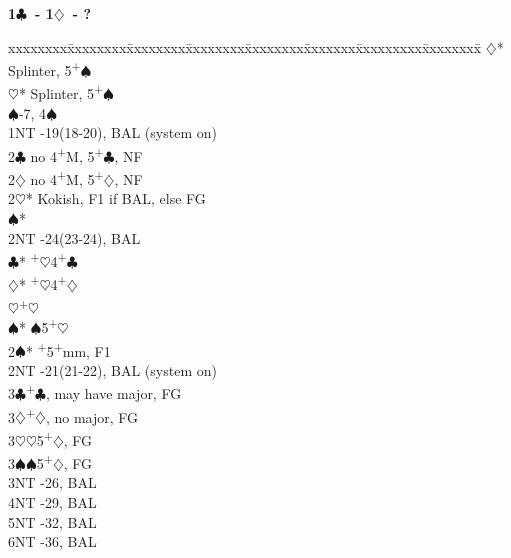\documentclass[10pt]{article}
\renewcommand{\c}{$\clubsuit$}
\renewcommand{\d}{$\diamondsuit$}
\newcommand{\h}{$\heartsuit$}
\newcommand{\s}{$\spadesuit$}
\newcommand{\p}{\textsuperscript{+}}
\newenvironment{bidtable}[1][]
{\textbf{#1}
  \begin{adjustwidth}{1em}{}
    \addvspace{2pt}
    \begin{tabbing}
      xxxxxxxx\=xxxxxxxx\=xxxxxxxx\=xxxxxxxx\=xxxxxxxx\=xxxxxxx\=xxxxxxxxx\=xxxxxxxx\=\kill}
{\end{tabbing}\end{adjustwidth}\bigskip}%
\begin{document}
\begin{bidtable}[1\c\ - 1\d\ - ?]
     \d* \> Splinter, 5\p\s                    \\
     \h* \> Splinter, 5\p\s                    \\
     \s  {}-7, 4\s                           \\
1NT  -19(18-20), BAL (system on)              \\
2\c  \> no 4\p M, 5\p\c, NF                        \\
2\d  \> no 4\p M, 5\p\d, NF                        \\
2\h* \> Kokish, F1 if BAL, else FG                 \\
     \s* \>                                    \\
     \>      \> 2NT      -24(23-24), BAL      \\
     \>      \c*     {}\p\h 4\p\c            \\
     \>      \d*     {}\p\h 4\p\d            \\
     \>      \h      {}\p\h                  \\
     \>      \s*     {}\s 5\p\h              \\
2\s* {}\p 5\p mm, F1                             \\
2NT  -21(21-22), BAL (system on)              \\
3\c  {}\p\c, may have major, FG                  \\
3\d  {}\p\d, no major, FG                        \\
3\h  {}\h 5\p\d, FG                              \\
3\s  {}\s 5\p\d, FG                              \\
3NT  -26, BAL                                 \\
4NT  -29, BAL                                 \\
5NT  -32, BAL                                 \\
6NT  -36, BAL
\end{bidtable}
\end{document}
